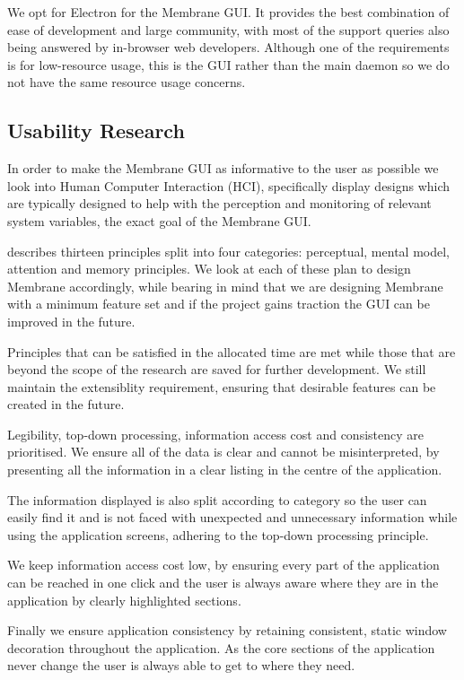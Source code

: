\documentclass[11pt, a4paper, twoside]{report}
\begin{document}
We opt for Electron for the Membrane GUI. It provides the best combination of ease of development and large community, with most of the support queries also being answered by in-browser web developers. Although one of the requirements is for low-resource usage, this is the GUI rather than the main daemon so we do not have the same resource usage concerns.

\subsection{Usability Research}

In order to make the Membrane GUI as informative to the user as possible we look into Human Computer Interaction (HCI), specifically display designs which are typically designed to help with the perception and monitoring of relevant system variables, the exact goal of the Membrane GUI.

\cite{wickens1998introduction} describes thirteen principles split into four categories: perceptual, mental model, attention and memory principles. We look at each of these plan to design Membrane accordingly, while bearing in mind that we are designing Membrane with a minimum feature set \citep{blank2010mfs} and if the project gains traction the GUI can be improved in the future.

Principles that can be satisfied in the allocated time are met while those that are beyond the scope of the research are saved for further development. We still maintain the extensiblity requirement, ensuring that desirable features can be created in the future.

Legibility, top-down processing, information access cost and consistency are prioritised. We ensure all of the data is clear and cannot be misinterpreted, by presenting all the information in a clear listing in the centre of the application.

The information displayed is also split according to category so the user can easily find it and is not faced with unexpected and unnecessary information while using the application screens, adhering to the top-down processing principle.

We keep information access cost low, by ensuring every part of the application can be reached in one click and the user is always aware where they are in the application by clearly highlighted sections.

Finally we ensure application consistency by retaining consistent, static window decoration throughout the application. As the core sections of the application never change the user is always able to get to where they need.
\end{document}
